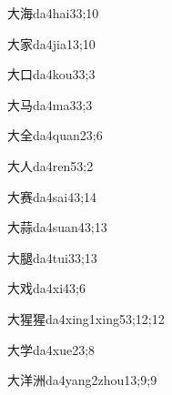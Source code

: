 \begin{verbete}{大海}{da4hai3}{3;10}
\end{verbete}

\begin{verbete}{大家}{da4jia1}{3;10}
\end{verbete}

\begin{verbete}{大口}{da4kou3}{3;3}
\end{verbete}

\begin{verbete}{大马}{da4ma3}{3;3}
\end{verbete}

\begin{verbete}{大全}{da4quan2}{3;6}
\end{verbete}

\begin{verbete}{大人}{da4ren5}{3;2}
\end{verbete}

\begin{verbete}{大赛}{da4sai4}{3;14}
\end{verbete}

\begin{verbete}{大蒜}{da4suan4}{3;13}
\end{verbete}

\begin{verbete}{大腿}{da4tui3}{3;13}
\end{verbete}

\begin{verbete}{大戏}{da4xi4}{3;6}
\end{verbete}

\begin{verbete}{大猩猩}{da4xing1xing5}{3;12;12}
\end{verbete}

\begin{verbete}{大学}{da4xue2}{3;8}
\end{verbete}

\begin{verbete}{大洋洲}{da4yang2zhou1}{3;9;9}
\end{verbete}

